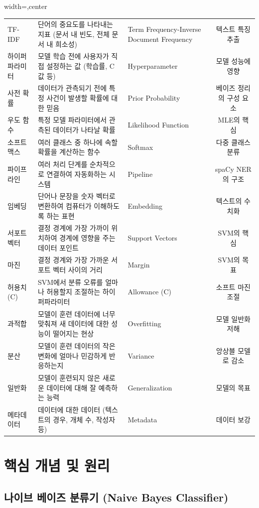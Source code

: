 \documentclass[11pt,a4paper]{article}
\begin{document}
\begin{adjustbox}{width=\textwidth,center}
\begin{tabular}{lllc}
TF-IDF & 단어의 중요도를 나타내는 지표 (문서 내 빈도, 전체 문서 내 희소성) & Term Frequency-Inverse Document Frequency & 텍스트 특징 추출 \\
하이퍼파라미터 & 모델 학습 전에 사용자가 직접 설정하는 값 (학습률, C 값 등) & Hyperparameter & 모델 성능에 영향 \\
사전 확률 & 데이터가 관측되기 전에 특정 사건이 발생할 확률에 대한 믿음 & Prior Probability & 베이즈 정리의 구성 요소 \\
우도 함수 & 특정 모델 파라미터에서 관측된 데이터가 나타날 확률 & Likelihood Function & MLE의 핵심 \\
소프트맥스 & 여러 클래스 중 하나에 속할 확률을 계산하는 함수 & Softmax & 다중 클래스 분류 \\
파이프라인 & 여러 처리 단계를 순차적으로 연결하여 자동화하는 시스템 & Pipeline & spaCy NER의 구조 \\
임베딩 & 단어나 문장을 숫자 벡터로 변환하여 컴퓨터가 이해하도록 하는 표현 & Embedding & 텍스트의 수치화 \\
서포트 벡터 & 결정 경계에 가장 가까이 위치하여 경계에 영향을 주는 데이터 포인트 & Support Vectors & SVM의 핵심 \\
마진 & 결정 경계와 가장 가까운 서포트 벡터 사이의 거리 & Margin & SVM의 목표 \\
허용치 (C) & SVM에서 분류 오류를 얼마나 허용할지 조절하는 하이퍼파라미터 & Allowance (C) & 소프트 마진 조절 \\
과적합 & 모델이 훈련 데이터에 너무 맞춰져 새 데이터에 대한 성능이 떨어지는 현상 & Overfitting & 모델 일반화 저해 \\
분산 & 모델이 훈련 데이터의 작은 변화에 얼마나 민감하게 반응하는지 & Variance & 앙상블 모델로 감소 \\
일반화 & 모델이 훈련되지 않은 새로운 데이터에 대해 잘 예측하는 능력 & Generalization & 모델의 목표 \\
메타데이터 & 데이터에 대한 데이터 (텍스트의 경우, 개체 수, 작성자 등) & Metadata & 데이터 보강 \\
\bottomrule
\end{tabular}
\end{adjustbox}

\newpage
\section*{핵심 개념 및 원리}

\subsection{나이브 베이즈 분류기 (Naive Bayes Classifier)}
\end{document}
